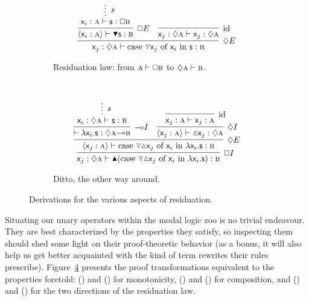 \begin{figure}
\begin{subfigure}{0.5\textwidth}
		\label{subfigure:modal_properties:interior}
	\end{subfigure}\\[\smallsep]
	\begin{subfigure}{1\textwidth}
		\[
			\infer[\diamond E]{\term{\varj}: \diamond \prop{a} \vdash \caseof{\diaelim \varj}{\vari }{s}:\prop{b}}{
				\infer[\bx E]{\bracket{\term{\vari }: \prop{a}} \vdash \boxelim\term{s}: \prop{b}}{
					\infer*[s]{\term{\vari }: \prop{a} \vdash \term{s}: \bx\prop{b}}{}
				}
				&
				\infer[\Ax]{\term{\varj}: \diamond \prop{a} \vdash \term{\varj}: \diamond \prop{a}}{}
			}
		\]
	\caption{Residuation law: from $\smallprop{a} \vdash \bx\smallprop{b}$ to $\diamond\smallprop{a} \vdash \smallprop{b}$.}
	\label{subfigure:modal_properties:residuation:1}	
	\end{subfigure}\\[\smallsep]
	\begin{subfigure}{1\textwidth}
		\[
			\infer[\bx I]{\term{\varj}: \diamond \prop{a} \vdash \boxintro(\caseof{\diaelim \diaintro \varj}{\vari }{\lam \vari .s}): \prop{b}}{
				\infer[\diamond E]{\bracket{\term{\varj}: \prop{a}} \vdash \caseof{\diaelim \diaintro \varj}{\vari }{\lam \vari .s}: \prop{b}}{
					\infer[\li I]{\vdash \term{\lam \vari .s}: \diamond\prop{a} \li \prop{b}}{
						\infer*[s]{\term{\vari }: \diamond\prop{a} \vdash \term{s}: \prop{b}}{}
					}
					&
					\infer[\diamond I]{\bracket{\term{\varj}: \prop{a}} \vdash \term{\diaintro \varj}: \diamond \prop{a}}{
						\infer[\Ax]{\term{\varj}: \prop{a} \vdash \term{\varj}: \prop{a}}{}
					}
				}
			}
		\]
		\caption{Ditto, the other way around.}
		\label{subfigure:modal_properties:residuation:2}	
	\end{subfigure}
	\caption{Derivations for the various aspects of residuation.}
	\label{figure:modal_properties:residuation}
\end{figure}

Situating our unary operators within the modal logic zoo is no trivial endeavour.
They are best characterized by the properties they satisfy, so inspecting them should shed some light on their proof-theoretic behavior (as a bonus, it will also help us get better acquainted with the kind of term rewrites their rules prescribe).
Figure~\ref{figure:modal_properties:residuation} presents the proof transformations equivalent to the properties foretold:
 () and () for monotonicity, () and () for composition, and () and () for the two directions of the residuation law.
 
